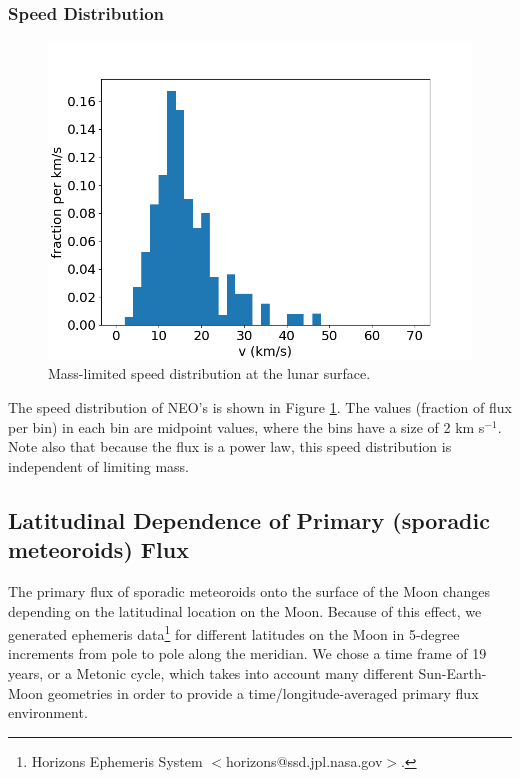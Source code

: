 \documentclass{hitec}
\numberwithin{equation}{section}
\begin{document}
\subsubsection{Speed Distribution}
\begin{figure}[h!]
	\centering
	\includegraphics[scale=0.45]{../NEA_Brown/vmass.png}
	\caption{Mass-limited speed distribution at the lunar surface.}\label{fig:vmass}
\end{figure}
The speed distribution of NEO's is shown in Figure \ref{fig:vmass}. The values (fraction of flux per bin) in each bin are midpoint values, where the bins have a size of 2 km s$^{-1}$. Note also that because the flux is a power law, this speed distribution is independent of limiting mass.


\clearpage

\subsection{Latitudinal Dependence of Primary (sporadic meteoroids) Flux}

The primary flux of sporadic meteoroids onto the surface of the Moon changes depending on the latitudinal location on the Moon. Because of this effect, we generated ephemeris data\footnote{Horizons Ephemeris System $<$horizons@ssd.jpl.nasa.gov$>$.} for different latitudes on the Moon in 5-degree increments from pole to pole along the meridian. We chose a time frame of 19 years, or a Metonic cycle, which takes into account many different Sun-Earth-Moon geometries in order to provide a time/longitude-averaged primary flux environment.
\end{document}
